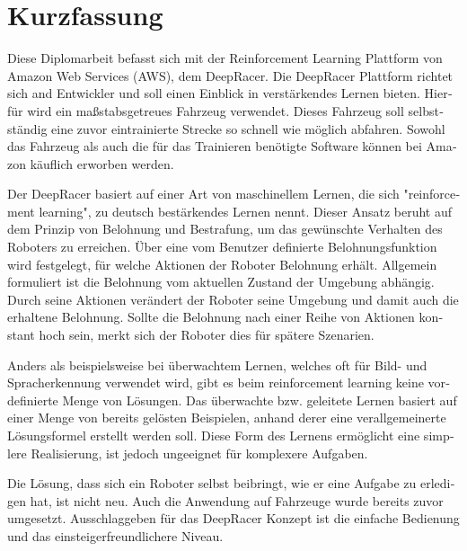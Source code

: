 \chapter{Kurzfassung}
\begin{german}
Diese Diplomarbeit befasst sich mit der Reinforcement Learning Plattform von Amazon Web Services (AWS), dem DeepRacer. Die DeepRacer Plattform richtet sich and Entwickler und soll einen Einblick in verstärkendes Lernen bieten. Hierfür wird ein maßstabsgetreues Fahrzeug verwendet. Dieses Fahrzeug soll selbstständig eine zuvor eintrainierte Strecke so schnell wie möglich abfahren. Sowohl das Fahrzeug als auch die für das Trainieren benötigte Software können bei Amazon käuflich erworben werden.

Der DeepRacer basiert auf einer Art von maschinellem Lernen, die sich "reinforcement learning", zu deutsch bestärkendes Lernen nennt. Dieser Ansatz beruht auf dem Prinzip von Belohnung und Bestrafung, um das gewünschte Verhalten des Roboters zu erreichen. Über eine vom Benutzer definierte Belohnungsfunktion wird festgelegt, für welche Aktionen der Roboter Belohnung erhält. Allgemein formuliert ist die Belohnung vom aktuellen Zustand der Umgebung abhängig. Durch seine Aktionen verändert der Roboter seine Umgebung und damit auch die erhaltene Belohnung. Sollte die Belohnung nach einer Reihe von Aktionen konstant hoch sein, merkt sich der Roboter dies für spätere Szenarien.

Anders als beispielsweise bei überwachtem Lernen, welches oft für Bild- und Spracherkennung verwendet wird, gibt es beim reinforcement learning keine vordefinierte Menge von Lösungen. Das überwachte bzw. geleitete Lernen basiert auf einer Menge von bereits gelösten Beispielen, anhand derer eine verallgemeinerte Lösungsformel erstellt werden soll. Diese Form des Lernens ermöglicht eine simplere Realisierung, ist jedoch ungeeignet für komplexere Aufgaben. 

Die Lösung, dass sich ein Roboter selbst beibringt, wie er eine Aufgabe zu erledigen hat, ist nicht neu. Auch die Anwendung auf Fahrzeuge wurde bereits zuvor umgesetzt. Ausschlaggeben für das DeepRacer Konzept ist die einfache Bedienung und das einsteigerfreundlichere Niveau. 
\end{german}
%
